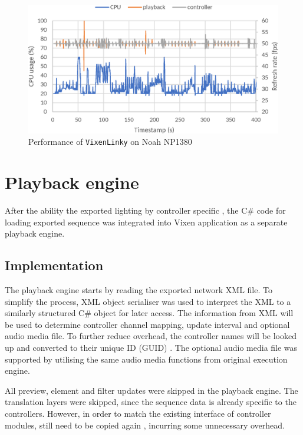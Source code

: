\begin{figure}[!t]
  \centering
  \includegraphics[width=0.8\columnwidth]{Figs/vixenlinky_noah.eps}
  \caption{\footnotesize Performance of \texttt{VixenLinky} on Noah NP1380}
  \label{fig:vixenlinky_noah}
\end{figure}

\section{Playback engine}

After  the ability  the exported lighting  by controller specific , the C\# code for loading exported sequence  was integrated into Vixen application as a separate playback engine.

\subsection{Implementation}

The playback engine starts by reading the exported network XML file. To simplify the process,  XML object serialiser was used to interpret  the XML  to a similarly structured C\# object for later access. The information  from XML will be used to determine controller channel mapping, update interval and optional audio media file. To further reduce  overhead, the controller names will be looked up and converted to their unique ID (GUID) . The optional audio media file was supported by utilising the same audio media functions from original execution engine.

All preview, element and filter updates were skipped in the playback engine. The translation layers were skipped, since the sequence data is already specific to the controllers. However, in order to match the existing interface of controller modules,  still need to be copied again , incurring some unnecessary overhead.

